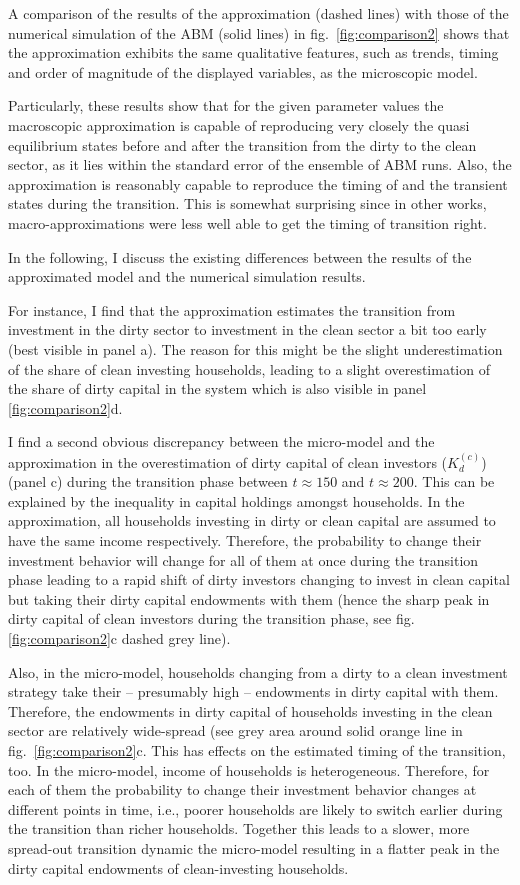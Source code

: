 A comparison of the results of the approximation (dashed lines) with those of the numerical simulation of the ABM (solid lines) in fig.~\ref{fig:comparison2} shows that the approximation exhibits the same qualitative features, such as trends, timing and order of magnitude of the displayed variables, as the microscopic model.

Particularly, these results show that for the given parameter values the macroscopic approximation is capable of reproducing very closely the quasi equilibrium states before and after the transition from the dirty to the clean sector, as it lies within the standard error of the ensemble of ABM runs. Also, the approximation is reasonably capable to reproduce the timing of and the transient states during the transition. This is somewhat surprising since in other works, macro-approximations were less well able to get the timing of transition right.

In the following, I discuss the existing differences between the results of the approximated model and the numerical simulation results. 

For instance, I find that the approximation estimates the transition from investment in the dirty sector to investment in the clean sector a bit too early (best visible in panel a). The reason for this might be the slight underestimation of the share of clean investing households, leading to a slight overestimation of the share of dirty capital in the system which is also visible in panel \ref{fig:comparison2}d.

I find a second obvious discrepancy between the micro-model and the approximation in the overestimation of dirty capital of clean investors ($K_d^{(c)}$) (panel c) during the transition phase between $t\approx 150$ and $t \approx 200$. This can be explained by the inequality in capital holdings amongst households. In the approximation, all households investing in dirty or clean capital are assumed to have the same income respectively. Therefore, the probability to change their investment behavior will change for all of them at once during the transition phase leading to a rapid shift of dirty investors changing to invest in clean capital but taking their dirty capital endowments with them (hence the sharp peak in dirty capital of clean investors during the transition phase, see fig.  \ref{fig:comparison2}c dashed grey line). 

Also, in the micro-model, households changing from a dirty to a clean investment strategy take their -- presumably high -- endowments in dirty capital with them. Therefore, the endowments in dirty capital of households investing in the clean sector are relatively wide-spread (see grey area around solid orange line in fig.~\ref{fig:comparison2}c. 
This has effects on the estimated timing of the transition, too. In the micro-model, income of households is heterogeneous. Therefore, for each of them the probability to change their investment behavior changes at different points in time, i.e., poorer households are likely to switch earlier during the transition than richer households. Together this leads to a slower, more spread-out transition dynamic the micro-model resulting in a flatter peak in the dirty capital endowments of clean-investing households.


